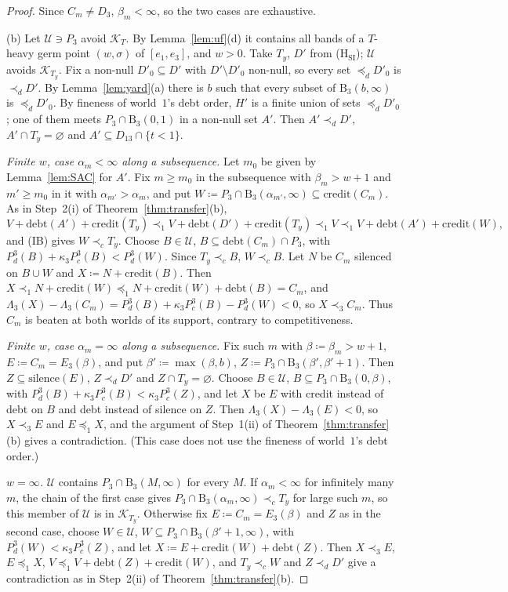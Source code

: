 \documentclass[11pt]{article}
\theoremstyle{definition}\newtheorem{definition}[theorem]{Definition}
\theoremstyle{remark}\newtheorem{remark}[theorem]{Remark}
\newcommand{\debt}{\mathrm{debt}}
\newcommand{\cred}{\mathrm{credit}}
\newcommand{\sil}{\mathrm{silence}}
\newcommand{\Band}{\mathrm{B}}
\newcommand{\Kid}{\mathcal K}
\newcommand{\Uf}{\mathcal U}
\begin{document}
\begin{proof}
Since $C_m\ne D_3$, $\beta_m<\infty$, so the two cases are exhaustive.

(b) Let $\Uf\ni P_3$ avoid $\Kid_T$. By Lemma~\ref{lem:uf}(d) it contains all
bands of a $T$-heavy germ point $(w,\sigma)$ of $[e_1,e_3]$, and $w>0$. Take
$T_y$, $D'$ from (H$_{\mathrm{SI}}$); $\Uf$ avoids $\Kid_{T_y}$. Fix a
non-null $D'_0\subseteq D'$ with $D'\setminus D'_0$ non-null, so every set
$\preceq_dD'_0$ is $\prec_dD'$. By Lemma~\ref{lem:yard}(a) there is $b$ such
that every subset of $\Band_3(b,\infty)$ is $\preceq_dD'_0$. By fineness of
world~$1$'s debt order, $H'$ is a finite union of sets $\preceq_dD'_0$; one
of them meets $P_3\cap\Band_3(0,1)$ in a non-null set $A'$. Then
$A'\prec_dD'$, $A'\cap T_y=\varnothing$ and $A'\subseteq D_{13}\cap\{t<1\}$.

\emph{Finite $w$, case $\alpha_m<\infty$ along a subsequence.} Let $m_0$ be
given by Lemma~\ref{lem:SAC} for $A'$. Fix $m\ge m_0$ in the subsequence
with $\beta_m>w+1$ and $m'\ge m_0$ in it with $\alpha_{m'}>\alpha_m$, and put
$W\coloneqq P_3\cap\Band_3(\alpha_{m'},\infty)\subseteq\cred(C_m)$. As in
Step~2(i) of Theorem~\ref{thm:transfer}(b),
\[
 V+\debt(A')+\cred(T_y)\prec_1V+\debt(D')+\cred(T_y)\prec_1V
 \prec_1V+\debt(A')+\cred(W),
\]
and (IB) gives $W\prec_cT_y$. Choose $B\in\Uf$,
$B\subseteq\debt(C_m)\cap P_3$, with $P^3_d(B)+\kappa_3P^3_c(B)<P^3_d(W)$.
Since $T_y\prec_cB$, $W\prec_cB$. Let $N$ be $C_m$ silenced on $B\cup W$ and
$X\coloneqq N+\cred(B)$. Then $X\prec_1N+\cred(W)\preceq_1
N+\cred(W)+\debt(B)=C_m$, and
$\Lambda_3(X)-\Lambda_3(C_m)=P^3_d(B)+\kappa_3P^3_c(B)-P^3_d(W)<0$, so
$X\prec_3C_m$. Thus $C_m$ is beaten at both worlds of its support, contrary
to competitiveness.

\emph{Finite $w$, case $\alpha_m=\infty$ along a subsequence.} Fix such $m$
with $\beta\coloneqq\beta_m>w+1$, $E\coloneqq C_m=E_3(\beta)$, and put
$\beta'\coloneqq\max(\beta,b)$, $Z\coloneqq P_3\cap\Band_3(\beta',\beta'+1)$.
Then $Z\subseteq\sil(E)$, $Z\prec_dD'$ and $Z\cap T_y=\varnothing$. Choose
$B\in\Uf$, $B\subseteq P_3\cap\Band_3(0,\beta)$, with
$P^3_d(B)+\kappa_3P^3_c(B)<\kappa_3P^3_c(Z)$, and let $X$ be $E$ with credit
instead of debt on $B$ and debt instead of silence on $Z$. Then
$\Lambda_3(X)-\Lambda_3(E)<0$, so $X\prec_3E$ and $E\preceq_1X$, and the
argument of Step~1(ii) of Theorem~\ref{thm:transfer}(b) gives a
contradiction. (This case does not use the fineness of world~$1$'s debt
order.)

\emph{$w=\infty$.} $\Uf$ contains $P_3\cap\Band_3(M,\infty)$ for every
$M$. If $\alpha_m<\infty$ for infinitely many $m$, the chain of the first
case gives $P_3\cap\Band_3(\alpha_m,\infty)\prec_cT_y$ for large such $m$, so
this member of $\Uf$ is in $\Kid_{T_y}$. Otherwise fix $E\coloneqq
C_m=E_3(\beta)$ and $Z$ as in the second case, choose $W\in\Uf$,
$W\subseteq P_3\cap\Band_3(\beta'+1,\infty)$, with
$P^3_d(W)<\kappa_3P^3_c(Z)$, and let $X\coloneqq E+\cred(W)+\debt(Z)$. Then
$X\prec_3E$, $E\preceq_1X$, $V\preceq_1V+\debt(Z)+\cred(W)$, and
$T_y\prec_cW$ and $Z\prec_dD'$ give a contradiction as in Step~2(ii) of
Theorem~\ref{thm:transfer}(b).
\end{proof}
\end{document}
